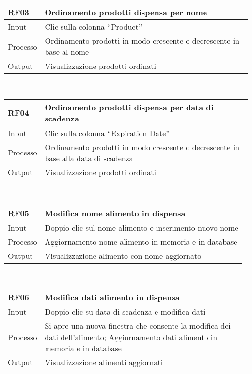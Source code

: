 \documentclass[
]{article}
\begin{document}
\begin{longtable}[]{@{}ll@{}}
\toprule\noalign{}
RF03 & Ordinamento prodotti dispensa per nome \\
\midrule\noalign{}
\endhead
\bottomrule\noalign{}
\endlastfoot
Input & Clic sulla colonna ``Product'' \\
Processo & Ordinamento prodotti in modo crescente o decrescente in base
al nome \\
Output & Visualizzazione prodotti ordinati \\
\end{longtable}

~

\begin{longtable}[]{@{}ll@{}}
\toprule\noalign{}
RF04 & Ordinamento prodotti dispensa per data di scadenza \\
\midrule\noalign{}
\endhead
\bottomrule\noalign{}
\endlastfoot
Input & Clic sulla colonna ``Expiration Date'' \\
Processo & Ordinamento prodotti in modo crescente o decrescente in base
alla data di scadenza \\
Output & Visualizzazione prodotti ordinati \\
\end{longtable}

~

\begin{longtable}[]{@{}ll@{}}
\toprule\noalign{}
RF05 & Modifica nome alimento in dispensa \\
\midrule\noalign{}
\endhead
\bottomrule\noalign{}
\endlastfoot
Input & Doppio clic sul nome alimento e inserimento nuovo nome \\
Processo & Aggiornamento nome alimento in memoria e in database \\
Output & Visualizzazione alimento con nome aggiornato \\
\end{longtable}

~

\begin{longtable}[]{@{}ll@{}}
\toprule\noalign{}
RF06 & Modifica dati alimento in dispensa \\
\midrule\noalign{}
\endhead
\bottomrule\noalign{}
\endlastfoot
Input & Doppio clic su data di scadenza e modifica dati \\
Processo & Si apre una nuova finestra che consente la modifica dei dati
dell'alimento; Aggiornamento dati alimento in memoria e in database \\
Output & Visualizzazione alimenti aggiornati \\
\end{longtable}
\end{document}
